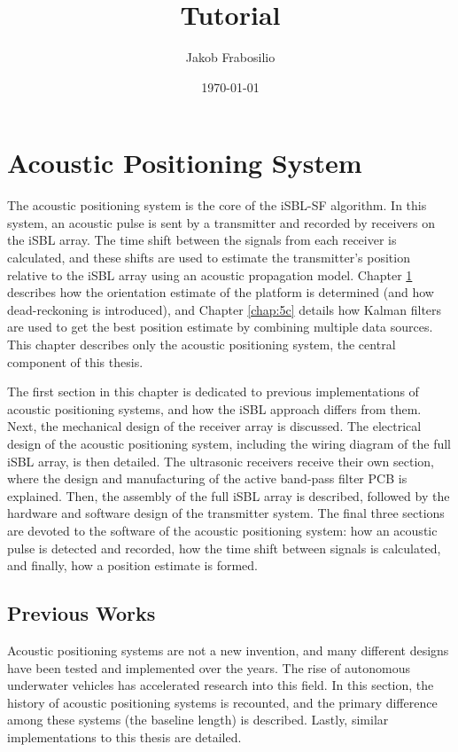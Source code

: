 \documentclass[12pt,a4paper]{report}
\title{Tutorial}
\author{Jakob Frabosilio}
\date{\today}
\begin{document}
	
\chapter{Acoustic Positioning System} \label{chap:4c}
The acoustic positioning system is the core of the iSBL-SF algorithm. In this system, an acoustic pulse is sent by a transmitter and recorded by receivers on the iSBL array. The time shift between the signals from each receiver is calculated, and these shifts are used to estimate the transmitter’s position relative to the iSBL array using an acoustic propagation model. Chapter \ref{chap:4c} describes how the orientation estimate of the platform is determined (and how dead-reckoning is introduced), and Chapter \ref{chap:5c} details how Kalman filters are used to get the best position estimate by combining multiple data sources. This chapter describes only the acoustic positioning system, the central component of this thesis.

The first section in this chapter is dedicated to previous implementations of acoustic positioning systems, and how the iSBL approach differs from them. Next, the mechanical design of the receiver array is discussed. The electrical design of the acoustic positioning system, including the wiring diagram of the full iSBL array, is then detailed. The ultrasonic receivers receive their own section, where the design and manufacturing of the active band-pass filter PCB is explained. Then, the assembly of the full iSBL array is described, followed by the hardware and software design of the transmitter system. The final three sections are devoted to the software of the acoustic positioning system: how an acoustic pulse is detected and recorded, how the time shift between signals is calculated, and finally, how a position estimate is formed.

\section{Previous Works} \label{sec:3s1}
Acoustic positioning systems are not a new invention, and many different designs have been tested and implemented over the years. The rise of autonomous underwater vehicles has accelerated research into this field. In this section, the history of acoustic positioning systems is recounted, and the primary difference among these systems (the baseline length) is described. Lastly, similar implementations to this thesis are detailed.
\end{document}
